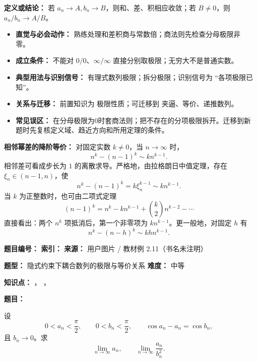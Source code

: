 \par
\begin{knowledgeBox}
\textbf{定义或结论：} 若 $a_n\to A,b_n\to B$，则和、差、积相应收敛；若 $B\ne0$，则 $a_n/b_n\to A/B$。

\begin{itemize}
  \item \textbf{直觉与必会动作：} 熟练处理和差积商与常数倍；商法则先检查分母极限非零。
  \item \textbf{成立条件：} 不能对 $0/0$、$\infty/\infty$ 直接分别取极限；无穷大不是普通实数。
  \item \textbf{典型用法与识别信号：} 有理式数列极限；拆分极限；识别信号为 “各项极限已知”。
  \item \textbf{关系与迁移：} 前置知识为 极限性质；可迁移到 夹逼、等价、递推数列。
  \item \textbf{常见误区：} 在分母极限为0时套商法则；把不存在的分项极限拆开。迁移到新题时先复核定义域、趋近方向和所用定理的条件。
\end{itemize}

\textbf{相邻幂差的降阶等价：} 对固定实数 $k\ne0$，当 $n\to\infty$ 时，
\[
n^k-(n-1)^k\sim k n^{k-1}.
\]
相邻差可看成步长为 $1$ 的离散求导。严格地，由拉格朗日中值定理，存在 $\xi_n\in(n-1,n)$，使
\[
n^k-(n-1)^k=k\xi_n^{k-1}\sim k n^{k-1}.
\]
当 $k$ 为正整数时，也可由二项式定理
\[
(n-1)^k=n^k-kn^{k-1}+\binom{k}{2}n^{k-2}-\cdots
\]
直接看出：两个 $n^k$ 项抵消后，第一个非零项为 $k n^{k-1}$。更一般地，对固定 $h$ 有
\[
n^k-(n-h)^k\sim kh n^{k-1}.
\]
\end{knowledgeBox}

\begin{problemBox}
\begin{problemMeta}
\textbf{题目编号：}  \quad
\textbf{索引：}  \quad
\textbf{来源：} 用户图片 / 教材例 2.11（书名未注明）

\textbf{题型：} 隐式约束下耦合数列的极限与等价关系 \quad
\textbf{难度：} 中等

\textbf{知识点：} ，
，
\end{problemMeta}

\textbf{题目：}

设
\[
0<a_n<\frac{\pi}{2},\qquad 0<b_n<\frac{\pi}{2},\qquad
\cos a_n-a_n=\cos b_n,
\]
且 \(b_n\to0\)。求
\[
\lim_{n\to\infty}a_n,\qquad
\lim_{n\to\infty}\frac{a_n}{b_n^2}.
\]
\end{problemBox}

